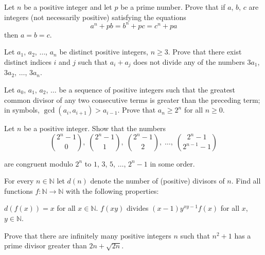 
\item[\textbf{N1.}]
Let 
$n$
 be a positive integer and let 
$p$
 be a prime number. Prove that if 
$a$, 
$b$, 
$c$
 are integers (not necessarily positive) satisfying the equations 
\[ a^n + pb = b^n + pc = c^n + pa\]
 then 
$a = b = c$.

\item[\textbf{N2.}]
Let 
$ a_1$, 
$ a_2$, 
$ \ldots$, 
$ a_n$
 be distinct positive integers, 
$ n\ge 3$.
 Prove that there exist distinct indices 
$ i$
 and 
$ j$
 such that 
$ a_i + a_j$
 does not divide any of the numbers 
$ 3a_1$, 
$ 3a_2$, 
$ \ldots$, 
$ 3a_n$.

\item[\textbf{N3.}]
Let 
$ a_0$, 
$ a_1$, 
$ a_2$, 
$ \ldots$
 be a sequence of positive integers such that the greatest common divisor of any two consecutive terms is greater than the preceding term; in symbols, 
$ \gcd (a_i, a_{i + 1}) > a_{i - 1}$.
 Prove that 
$ a_n\ge 2^n$
 for all 
$ n\ge 0$.

\item[\textbf{N4.}]
Let 
$ n$
 be a positive integer. Show that the numbers
\[ \binom{2^n - 1}{0},\; \binom{2^n - 1}{1},\; \binom{2^n - 1}{2},\; \ldots,\; \binom{2^n - 1}{2^{n - 1} - 1}\]


are congruent modulo 
$ 2^n$
 to 
$ 1$, 
$ 3$, 
$ 5$, 
$ \ldots$, 
$ 2^n - 1$
 in some order.

\item[\textbf{N5.}]
For every 
$ n\in\mathbb{N}$
 let 
$ d(n)$
 denote the number of (positive) divisors of 
$ n$.
 Find all functions 
$ f: \mathbb{N}\to\mathbb{N}$
 with the following properties:

$ d\left(f(x)\right) = x$
 for all 
$ x\in\mathbb{N}$.
$ f(xy)$
 divides 
$ (x - 1)y^{xy - 1}f(x)$
 for all 
$ x$, 
$ y\in\mathbb{N}$.

\item[\textbf{N6.}]
Prove that there are infinitely many positive integers 
$ n$
 such that 
$ n^{2} + 1$
 has a prime divisor greater than 
$ 2n + \sqrt {2n}$.